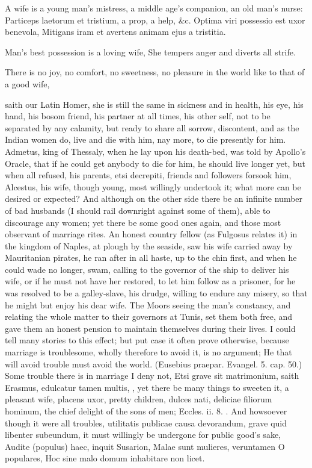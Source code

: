 {A wife is a young man's mistress, a middle age's companion, an
old man's nurse: Particeps laetorum et tristium, a prop, a help, \&c.
Optima viri possessio est uxor benevola,
Mitigans iram et avertens animam ejus a tristitia.

Man's best possession is a loving wife,
She tempers anger and diverts all strife.

There is no joy, no comfort, no sweetness, no pleasure in the world
like to that of a good wife,

saith our Latin Homer, she is still the same in sickness and in health,
his eye, his hand, his bosom friend, his partner at all times, his
other self, not to be separated by any calamity, but ready to share all
sorrow, discontent, and as the Indian women do, live and die with him,
nay more, to die presently for him. Admetus, king of Thessaly, when he
lay upon his death-bed, was told by Apollo's Oracle, that if he could
get anybody to die for him, he should live longer yet, but when all
refused, his parents, etsi decrepiti, friends and followers forsook
him, Alcestus, his wife, though young, most willingly undertook it;
what more can be desired or expected? And although on the other side
there be an infinite number of bad husbands (I should rail downright
against some of them), able to discourage any women; yet there be some
good ones again, and those most observant of marriage rites. An honest
country fellow (as Fulgosus relates it) in the kingdom of Naples,
at plough by the seaside, saw his wife carried away by
Mauritanian pirates, he ran after in all haste, up to the chin first,
and when he could wade no longer, swam, calling to the governor of the
ship to deliver his wife, or if he must not have her restored, to let
him follow as a prisoner, for he was resolved to be a galley-slave, his
drudge, willing to endure any misery, so that he might but enjoy his
dear wife. The Moors seeing the man's constancy, and relating the whole
matter to their governors at Tunis, set them both free, and gave them
an honest pension to maintain themselves during their lives. I could
tell many stories to this effect; but put case it often prove
otherwise, because marriage is troublesome, wholly therefore to avoid
it, is no argument; He that will avoid trouble must avoid the
world. (Eusebius praepar. Evangel. 5. cap. 50.) Some trouble there is
in marriage I deny not, Etsi grave sit matrimonium, saith Erasmus,
edulcatur tamen multis, \etc{}, yet there be many things to sweeten
it, a pleasant wife, placens uxor, pretty children, dulces nati,
deliciae filiorum hominum, the chief delight of the sons of men;
Eccles. ii. 8. \etc{}. And howsoever though it were all troubles,
utilitatis publicae causa devorandum, grave quid libenter
subeundum, it must willingly be undergone for public good's sake,
Audite (populus) haec, inquit Susarion,
Malae sunt mulieres, veruntamen O populares,
Hoc sine malo domum inhabitare non licet.

}
